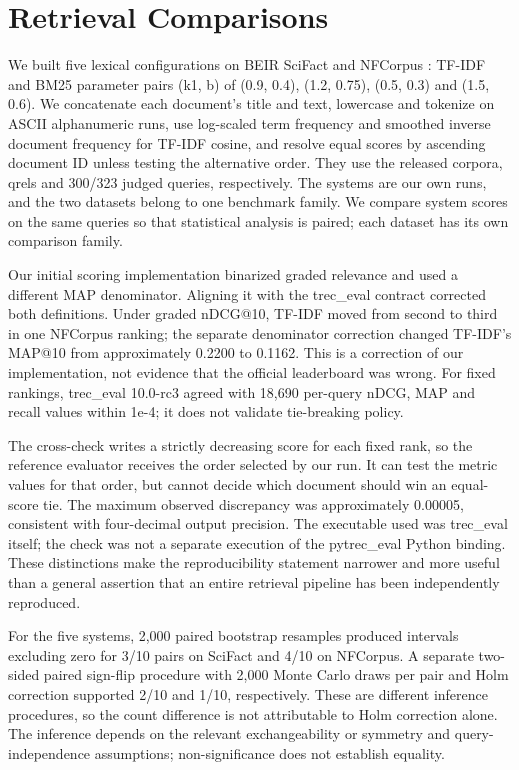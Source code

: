 \documentclass[runningheads]{llncs}
\begin{document}
\section{Retrieval Comparisons}\label{retrieval-comparisons}

We built five lexical configurations on BEIR SciFact and NFCorpus
\cite{r2}: TF-IDF and BM25 parameter pairs (k1, b) of (0.9, 0.4), (1.2,
0.75), (0.5, 0.3) and (1.5, 0.6). We concatenate each document's title
and text, lowercase and tokenize on ASCII alphanumeric runs, use
log-scaled term frequency and smoothed inverse document frequency for
TF-IDF cosine, and resolve equal scores by ascending document ID unless
testing the alternative order. They use the released corpora, qrels and
300/323 judged queries, respectively. The systems are our own runs, and
the two datasets belong to one benchmark family. We compare system
scores on the same queries so that statistical analysis is paired; each
dataset has its own comparison family.

Our initial scoring implementation binarized graded relevance and used a
different MAP denominator. Aligning it with the trec\_eval contract
corrected both definitions. Under graded nDCG@10, TF-IDF moved from
second to third in one NFCorpus ranking; the separate denominator
correction changed TF-IDF's MAP@10 from approximately 0.2200 to 0.1162.
This is a correction of our implementation, not evidence that the
official leaderboard was wrong. For fixed rankings, trec\_eval 10.0-rc3
agreed with 18,690 per-query nDCG, MAP and recall values within 1e-4; it
does not validate tie-breaking policy.

The cross-check writes a strictly decreasing score for each fixed rank,
so the reference evaluator receives the order selected by our run. It
can test the metric values for that order, but cannot decide which
document should win an equal-score tie. The maximum observed discrepancy
was approximately 0.00005, consistent with four-decimal output
precision. The executable used was trec\_eval itself; the check was not
a separate execution of the pytrec\_eval Python binding. These
distinctions make the reproducibility statement narrower and more useful
than a general assertion that an entire retrieval pipeline has been
independently reproduced.

For the five systems, 2,000 paired bootstrap resamples produced
intervals excluding zero for 3/10 pairs on SciFact and 4/10 on NFCorpus.
A separate two-sided paired sign-flip procedure with 2,000 Monte Carlo
draws per pair and Holm correction supported 2/10 and 1/10,
respectively. These are different inference procedures, so the count
difference is not attributable to Holm correction alone. The inference
depends on the relevant exchangeability or symmetry and
query-independence assumptions; non-significance does not establish
equality.
\end{document}
